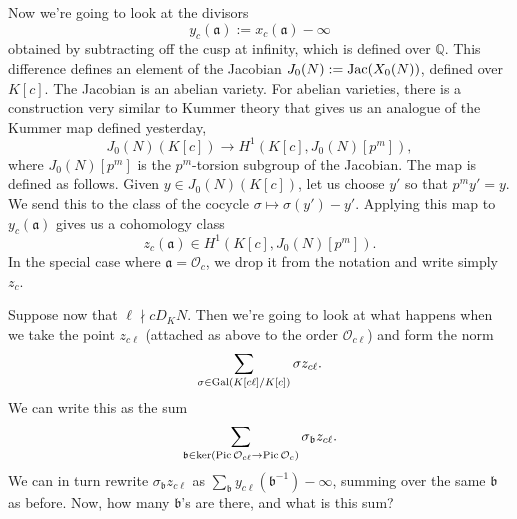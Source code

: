\documentclass[reqno]{amsart} 
\numberwithin{theorem}{section}
\numberwithin{equation}{section}
\numberwithin{exercise}{section}
\begin{document}
Now we're going to look at the divisors
\begin{equation*}
  y_c(\mathfrak{a}) := x_c(\mathfrak{a}) - \infty
\end{equation*}
obtained by subtracting off the cusp at infinity, which is defined over $\mathbb{Q}$.  This difference defines an element of the Jacobian $J_0(N) := \operatorname{Jac}(X_0(N))$, defined over $K[c]$.  The Jacobian is an abelian variety.  For abelian varieties, there is a construction very similar to Kummer theory that gives us an analogue of the Kummer map defined yesterday,
\begin{equation*}
  J_0(N)(K[c]) \rightarrow H^1(K[c], J_0(N)[p^m]),
\end{equation*}
where $J_0(N)[p^m]$ is the $p^m$-torsion subgroup of the Jacobian.  The map is defined as follows.  Given $y \in J_0(N)(K[c])$, let us choose $y '$ so that $p^m y' = y$.  We send this to the class of the cocycle $\sigma \mapsto \sigma(y') - y'$.  Applying this map to  $y_c(\mathfrak{a})$ gives us a cohomology class
\begin{equation*}
  z_c(\mathfrak{a}) \in H^1(K[c], J_0(N)[p^m]).
\end{equation*}
In the special case where $\mathfrak{a} = \mathcal{O}_c$, we drop it from the notation and write simply $z_c$.

Suppose now that $\ell \nmid c D_K N$.  Then we're going to look at what happens when we take the point $z_{c \ell}$ (attached as above to the order $\mathcal{O}_{c \ell}$) and form the norm
\begin{equation*}
  \sum_{\sigma \in \operatorname{Gal}(K[c \ell] / K[c])} \sigma z_{c \ell}.
\end{equation*}
We can write this as the sum
\begin{equation*}
  \sum_{\mathfrak{b} \in \ker(\operatorname{Pic} \mathcal{O}_{c \ell} \rightarrow \operatorname{Pic} \mathcal{O}_c)} \sigma_{\mathfrak{b}} z_{c \ell}.
\end{equation*}
We can in turn rewrite $\sigma_{\mathfrak{b}} z_{c \ell}$ as $\sum_{\mathfrak{b}} y_{c \ell}(\mathfrak{b}^{-1}) - \infty$, summing over the same $\mathfrak{b}$ as before.  Now, how many $\mathfrak{b}$'s are there, and what is this sum?
\end{document}
